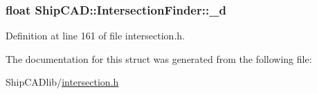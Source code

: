 \subsubsection[{\texorpdfstring{\+\_\+d}{_d}}]{\setlength{\rightskip}{0pt plus 5cm}float Ship\+C\+A\+D\+::\+Intersection\+Finder\+::\+\_\+d}\hypertarget{structShipCAD_1_1IntersectionFinder_a3155359937831f04d1f44ad660463f30}{}\label{structShipCAD_1_1IntersectionFinder_a3155359937831f04d1f44ad660463f30}


Definition at line 161 of file intersection.\+h.



The documentation for this struct was generated from the following file\+:\begin{DoxyCompactItemize}
\item 
Ship\+C\+A\+Dlib/\hyperlink{intersection_8h}{intersection.\+h}\end{DoxyCompactItemize}
